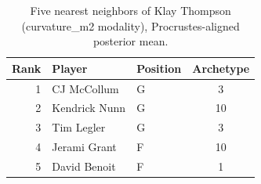 \begin{table}[htbp]
  \centering\small
  \begin{tabular}{rllc}
    \toprule
    Rank & Player & Position & Archetype \\
    \midrule
    1 & CJ McCollum & G & 3 \\
    2 & Kendrick Nunn & G & 10 \\
    3 & Tim Legler & G & 3 \\
    4 & Jerami Grant & F & 10 \\
    5 & David Benoit & F & 1 \\
    \bottomrule
  \end{tabular}
  \caption{Five nearest neighbors of Klay Thompson (curvature_m2 modality), Procrustes-aligned posterior mean.}
  \label{tab:Klay_Thompson_neighbors_curvature_m2}
\end{table}

